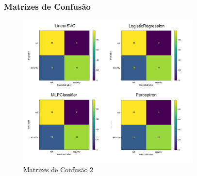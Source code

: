 \begin{frame}
  \frametitle{Matrizes de Confusão}
  \begin{figure}[htbp]
    \centerline{\includegraphics[width=25em]{../report/images/conf_mat_2.png}}
    \caption{Matrizes de Confusão 2}
    \label{fig:conf_mat_2}
  \end{figure}
\end{frame}